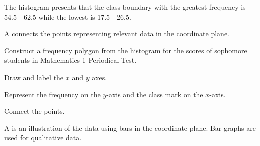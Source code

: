 The histogram presents that the class boundary with the greatest frequency is
54.5 - 62.5 while the lowest is 17.5 - 26.5.
\begin{definition}
A  connects the points representing relevant data in the
coordinate plane.
\end{definition}
\begin{example}
\Item Construct a frequency polygon from the histogram for the scores of
sophomore students in Mathematics 1 Periodical Test.

\Solution

\begin{myenumerate}
\item Draw and label the $x$ and $y$ axes.
\item Represent the frequency on the $y$-axis and the class mark on the $x$-axis.
\item Connect the points.
\begin{center}
\label{chap10fig:8}
\end{center}
\end{myenumerate}
\end{example}
\begin{definition}
A  is an illustration of the data using bars in the coordinate plane.
Bar graphs are used for qualitative data. %
\end{definition}
